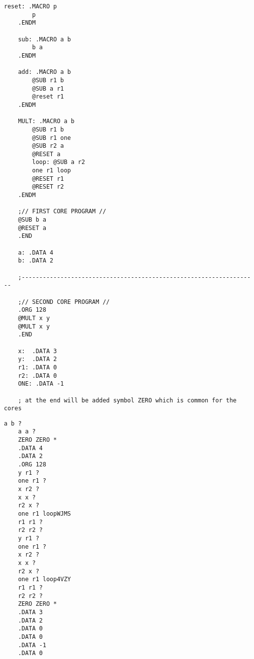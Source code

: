 \documentclass[../main.tex]{subfiles}
\begin{document}
\begin{lstlisting}[caption={Exemplu de cod în subleq assembly}, label={lst:code}]
    reset: .MACRO p
        p
    .ENDM
    
    sub: .MACRO a b
        b a
    .ENDM
    
    add: .MACRO a b
        @SUB r1 b
        @SUB a r1
        @reset r1
    .ENDM
    
    MULT: .MACRO a b
        @SUB r1 b
        @SUB r1 one
        @SUB r2 a
        @RESET a
        loop: @SUB a r2
        one r1 loop
        @RESET r1
        @RESET r2
    .ENDM
    
    ;// FIRST CORE PROGRAM //
    @SUB b a
    @RESET a
    .END
    
    a: .DATA 4
    b: .DATA 2
    
    ;-------------------------------------------------------------------
    
    ;// SECOND CORE PROGRAM //
    .ORG 128
    @MULT x y
    @MULT x y
    .END
    
    x:  .DATA 3
    y:  .DATA 2
    r1: .DATA 0
    r2: .DATA 0
    ONE: .DATA -1
    
    ; at the end will be added symbol ZERO which is common for the cores
\end{lstlisting}

\begin{lstlisting}[caption={Conținutul fișierului intermediar pentru exemplul dat}, label={lst:intermediate}]
    a b ? 
    a a ? 
    ZERO ZERO *
    .DATA 4
    .DATA 2
    .ORG 128
    y r1 ? 
    one r1 ? 
    x r2 ? 
    x x ? 
    r2 x ? 
    one r1 loopWJMS 
    r1 r1 ? 
    r2 r2 ? 
    y r1 ? 
    one r1 ? 
    x r2 ? 
    x x ? 
    r2 x ? 
    one r1 loop4VZY 
    r1 r1 ? 
    r2 r2 ? 
    ZERO ZERO *
    .DATA 3
    .DATA 2
    .DATA 0
    .DATA 0
    .DATA -1
    .DATA 0
\end{lstlisting}
\end{document}
